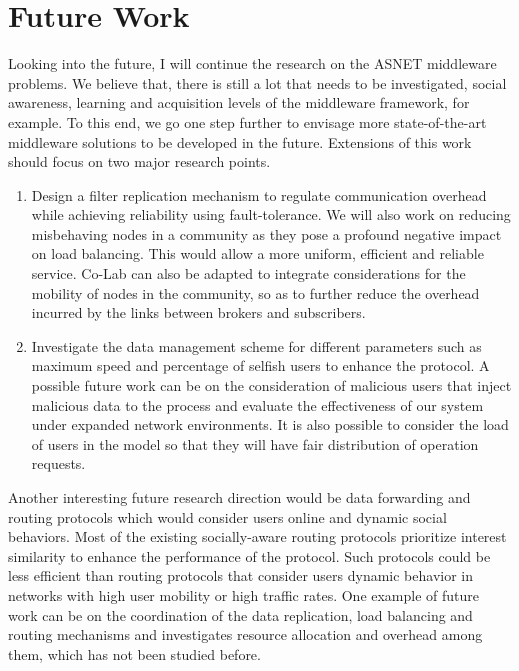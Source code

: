 \section{Future Work}\label{Chap7_02}
Looking into the future, I will continue the research on the ASNET middleware problems. We believe that, there is still a lot that needs to be investigated, social awareness, learning and acquisition levels of the middleware framework, for example. To this end, we go one step further to envisage more state-of-the-art middleware solutions to be developed in the future. Extensions of this work should focus on two major research points.

\begin{enumerate}
    \item {Design a filter replication mechanism to regulate communication overhead while achieving reliability using fault-tolerance. We will also work on reducing misbehaving nodes in a community as they pose a profound negative impact on load balancing. This would allow a more uniform, efficient and reliable service. Co-Lab can also be adapted to integrate considerations for the mobility of nodes in the community, so as to further reduce the overhead incurred by the links between brokers and subscribers.}
    \item {Investigate the data management scheme for different parameters such as maximum speed and percentage of selfish users to enhance the protocol. A possible future work can be on the consideration of malicious users that inject malicious data to the process and evaluate the effectiveness of our system under expanded network environments. It is also possible to consider the load of users in the model so that they will have fair distribution of operation requests.}
\end{enumerate}

Another interesting future research direction would be data forwarding and routing protocols which would consider users online and dynamic social behaviors. Most of the existing socially-aware routing protocols prioritize interest similarity to enhance the performance of the protocol. Such protocols could be less efficient than routing protocols that consider users dynamic behavior in networks with high user mobility or high traffic rates. One example of future work can be on the coordination of the data replication, load balancing and routing mechanisms and investigates resource allocation and overhead among them, which has not been studied before.

